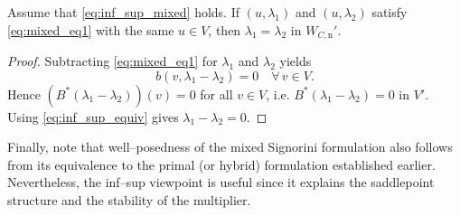 \begin{proposition}\label{prop:unique_multiplier}
	Assume that \eqref{eq:inf_sup_mixed} holds.
	If $(u,\lambda_1)$ and $(u,\lambda_2)$ satisfy \eqref{eq:mixed_eq1} with the same $u\in V$, then $\lambda_1=\lambda_2$ in $W_{C,\mathrm n}'$.
\end{proposition}
\begin{proof}
	Subtracting \eqref{eq:mixed_eq1} for $\lambda_1$ and $\lambda_2$ yields
	\begin{equation}\label{eq:bdiff_zero}
		b(v,\lambda_1-\lambda_2)=0\quad \forall\, v\in V.
	\end{equation}
	Hence $(B^*(\lambda_1-\lambda_2))(v)=0$ for all $v\in V$, i.e. $B^*(\lambda_1-\lambda_2)=0$ in $V'$.
	Using \eqref{eq:inf_sup_equiv} gives $\lambda_1-\lambda_2=0$.
\end{proof}

Finally, note that well--posedness of the mixed Signorini formulation also follows from its equivalence to the primal (or hybrid) formulation established earlier.  Nevertheless, the inf--sup viewpoint is useful since it explains the saddlepoint structure and the stability of the multiplier.